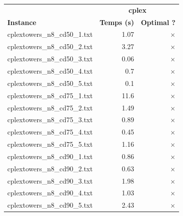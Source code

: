 \documentclass{article}
\begin{document}
\newpage
\begin{center}
\renewcommand{\arraystretch}{1.4} 
 \begin{tabular}{lrr}
	\hline
 & \multicolumn{2}{c}{\textbf{cplex}}\\
\textbf{Instance}  & \textbf{Temps (s)} & \textbf{Optimal ?} \\\hline

cplextowers\_n8\_cd50\_1.txt & 1.07 & 
$\times$
\\
cplextowers\_n8\_cd50\_2.txt & 3.27 & 
$\times$
\\
cplextowers\_n8\_cd50\_3.txt & 0.06 & 
$\times$
\\
cplextowers\_n8\_cd50\_4.txt & 0.7 & 
$\times$
\\
cplextowers\_n8\_cd50\_5.txt & 0.1 & 
$\times$
\\
cplextowers\_n8\_cd75\_1.txt & 11.6 & 
$\times$
\\
cplextowers\_n8\_cd75\_2.txt & 1.49 & 
$\times$
\\
cplextowers\_n8\_cd75\_3.txt & 0.89 & 
$\times$
\\
cplextowers\_n8\_cd75\_4.txt & 0.45 & 
$\times$
\\
cplextowers\_n8\_cd75\_5.txt & 1.16 & 
$\times$
\\
cplextowers\_n8\_cd90\_1.txt & 0.86 & 
$\times$
\\
cplextowers\_n8\_cd90\_2.txt & 0.63 & 
$\times$
\\
cplextowers\_n8\_cd90\_3.txt & 1.98 & 
$\times$
\\
cplextowers\_n8\_cd90\_4.txt & 1.03 & 
$\times$
\\
cplextowers\_n8\_cd90\_5.txt & 2.43 & 
$\times$
\\
\hline\end{tabular}
\end{center}
\end{document}

